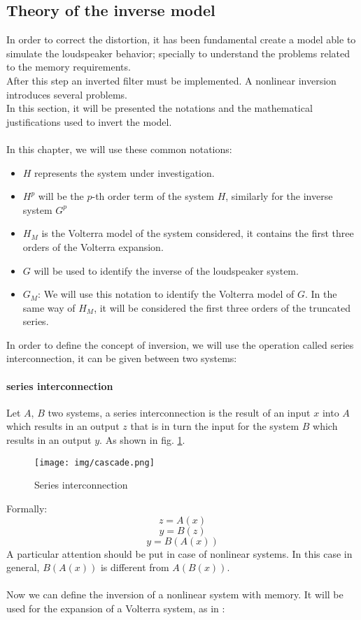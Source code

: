 \subsection{Theory of the inverse model}
In order to correct the distortion, it has been fundamental create a model able to simulate the loudspeaker behavior; specially to understand the problems related to the memory requirements.\\
After this step an inverted filter must be implemented. A nonlinear inversion introduces several problems.\\
In this section, it will be presented the notations and the mathematical justifications used to invert the model.\\\\
In this chapter, we will use these common notations:
\begin{itemize}
\item $H$ represents the system under investigation.
\item $H^p$ will be the $p$-th order term of the system $H$, similarly for the inverse system $G^p$
\item $H_M$ is the Volterra model of the system considered, it contains the first three orders of the Volterra expansion.
\item $G$ will be used to identify the inverse of the loudspeaker system.
\item $G_M$: We will use this notation to identify the Volterra model of $G$. In the same way of $H_M$, it will be considered the first three orders of the truncated series.
\end{itemize}
In order to define the concept of inversion, we will use the operation called series interconnection, it can be given between two systems:
\paragraph{series interconnection} Let $A$, $B$ two systems, a series interconnection is the result of an input $x$ into $A$ which results in an output $z$ that is in turn the input for the system $B$ which results in an output $y$. As shown in fig. \ref{fig:series}.
\begin{figure}[h!]\centering
\texttt{[image: img/cascade.png]} 
\caption{Series interconnection} \label{fig:series}
\end{figure}
Formally:
\[ z = A(x)\]
\[ y= B(z) \]
\[ y = B(A(x))\]
A particular attention should be put in case of nonlinear systems. In this case in general, $B(A(x))$ is different from $A(B(x))$.\\\\
Now we can define the inversion of a nonlinear system with memory. It will be used for the expansion of a Volterra system, as in \cite{designvolterra}:
